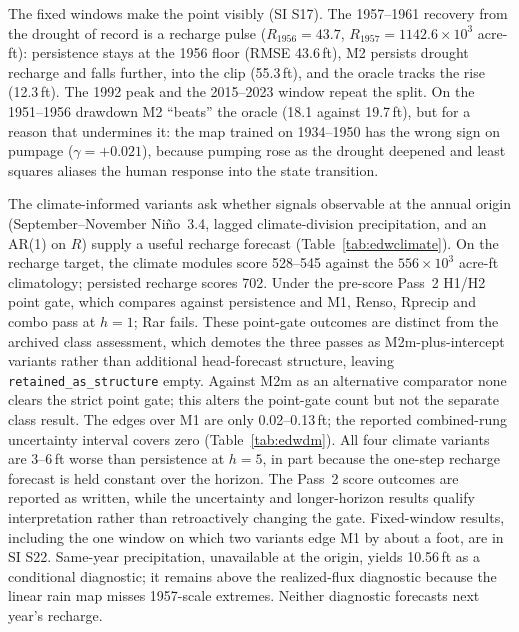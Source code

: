 \documentclass[preprint,11pt,authoryear]{elsarticle}
\theoremstyle{definition}
\theoremstyle{remark}
\begin{document}
The fixed windows make the point visibly (SI S17). The 1957--1961 recovery from the drought of record is a recharge pulse ($R_{1956}=43.7$, $R_{1957}=1142.6\times10^3$ acre-ft): persistence stays at the 1956 floor (RMSE 43.6\,ft), M2 persists drought recharge and falls further, into the clip (55.3\,ft), and the oracle tracks the rise (12.3\,ft). The 1992 peak and the 2015--2023 window repeat the split. On the 1951--1956 drawdown M2 ``beats'' the oracle (18.1 against 19.7\,ft), but for a reason that undermines it: the map trained on 1934--1950 has the wrong sign on pumpage ($\gamma=+0.021$), because pumping rose as the drought deepened and least squares aliases the human response into the state transition.

The climate-informed variants ask whether signals observable at the annual origin (September--November Ni\~no~3.4, lagged climate-division precipitation, and an AR(1) on $R$) supply a useful recharge forecast (Table~\ref{tab:edwclimate}). On the recharge target, the climate modules score 528--545 against the $556\times10^3$ acre-ft climatology; persisted recharge scores 702. Under the pre-score Pass~2 H1/H2 point gate, which compares against persistence and M1, Renso, Rprecip and combo pass at $h=1$; Rar fails. These point-gate outcomes are distinct from the archived class assessment, which demotes the three passes as M2m-plus-intercept variants rather than additional head-forecast structure, leaving \texttt{retained\_as\_structure} empty. Against M2m as an alternative comparator none clears the strict point gate; this alters the point-gate count but not the separate class result. The edges over M1 are only 0.02--0.13\,ft; the reported combined-rung uncertainty interval covers zero (Table~\ref{tab:edwdm}). All four climate variants are 3--6\,ft worse than persistence at $h=5$, in part because the one-step recharge forecast is held constant over the horizon. The Pass~2 score outcomes are reported as written, while the uncertainty and longer-horizon results qualify interpretation rather than retroactively changing the gate. Fixed-window results, including the one window on which two variants edge M1 by about a foot, are in SI S22. Same-year precipitation, unavailable at the origin, yields 10.56\,ft as a conditional diagnostic; it remains above the realized-flux diagnostic because the linear rain map misses 1957-scale extremes. Neither diagnostic forecasts next year's recharge.
\end{document}
